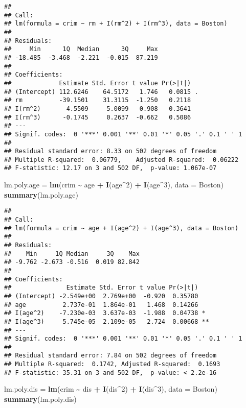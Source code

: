 \documentclass[
]{article}
\newenvironment{Shaded}{\begin{snugshade}}{\end{snugshade}}
\newcommand{\AttributeTok}[1]{\textcolor[rgb]{0.13,0.29,0.53}{#1}}
\newcommand{\DecValTok}[1]{\textcolor[rgb]{0.00,0.00,0.81}{#1}}
\newcommand{\FunctionTok}[1]{\textcolor[rgb]{0.13,0.29,0.53}{\textbf{#1}}}
\newcommand{\NormalTok}[1]{#1}
\newcommand{\OtherTok}[1]{\textcolor[rgb]{0.56,0.35,0.01}{#1}}
\newcommand{\SpecialCharTok}[1]{\textcolor[rgb]{0.81,0.36,0.00}{\textbf{#1}}}
\begin{document}
\begin{verbatim}
## 
## Call:
## lm(formula = crim ~ rm + I(rm^2) + I(rm^3), data = Boston)
## 
## Residuals:
##     Min      1Q  Median      3Q     Max 
## -18.485  -3.468  -2.221  -0.015  87.219 
## 
## Coefficients:
##             Estimate Std. Error t value Pr(>|t|)  
## (Intercept) 112.6246    64.5172   1.746   0.0815 .
## rm          -39.1501    31.3115  -1.250   0.2118  
## I(rm^2)       4.5509     5.0099   0.908   0.3641  
## I(rm^3)      -0.1745     0.2637  -0.662   0.5086  
## ---
## Signif. codes:  0 '***' 0.001 '**' 0.01 '*' 0.05 '.' 0.1 ' ' 1
## 
## Residual standard error: 8.33 on 502 degrees of freedom
## Multiple R-squared:  0.06779,    Adjusted R-squared:  0.06222 
## F-statistic: 12.17 on 3 and 502 DF,  p-value: 1.067e-07
\end{verbatim}

\begin{Shaded}
\begin{Highlighting}[]
\NormalTok{lm.poly.age }\OtherTok{=} \FunctionTok{lm}\NormalTok{(crim }\SpecialCharTok{\textasciitilde{}}\NormalTok{ age }\SpecialCharTok{+} \FunctionTok{I}\NormalTok{(age}\SpecialCharTok{\^{}}\DecValTok{2}\NormalTok{) }\SpecialCharTok{+} \FunctionTok{I}\NormalTok{(age}\SpecialCharTok{\^{}}\DecValTok{3}\NormalTok{), }\AttributeTok{data =}\NormalTok{ Boston)}
\FunctionTok{summary}\NormalTok{(lm.poly.age)}
\end{Highlighting}
\end{Shaded}

\begin{verbatim}
## 
## Call:
## lm(formula = crim ~ age + I(age^2) + I(age^3), data = Boston)
## 
## Residuals:
##    Min     1Q Median     3Q    Max 
## -9.762 -2.673 -0.516  0.019 82.842 
## 
## Coefficients:
##               Estimate Std. Error t value Pr(>|t|)   
## (Intercept) -2.549e+00  2.769e+00  -0.920  0.35780   
## age          2.737e-01  1.864e-01   1.468  0.14266   
## I(age^2)    -7.230e-03  3.637e-03  -1.988  0.04738 * 
## I(age^3)     5.745e-05  2.109e-05   2.724  0.00668 **
## ---
## Signif. codes:  0 '***' 0.001 '**' 0.01 '*' 0.05 '.' 0.1 ' ' 1
## 
## Residual standard error: 7.84 on 502 degrees of freedom
## Multiple R-squared:  0.1742, Adjusted R-squared:  0.1693 
## F-statistic: 35.31 on 3 and 502 DF,  p-value: < 2.2e-16
\end{verbatim}

\begin{Shaded}
\begin{Highlighting}[]
\NormalTok{lm.poly.dis }\OtherTok{=} \FunctionTok{lm}\NormalTok{(crim }\SpecialCharTok{\textasciitilde{}}\NormalTok{ dis }\SpecialCharTok{+} \FunctionTok{I}\NormalTok{(dis}\SpecialCharTok{\^{}}\DecValTok{2}\NormalTok{) }\SpecialCharTok{+} \FunctionTok{I}\NormalTok{(dis}\SpecialCharTok{\^{}}\DecValTok{3}\NormalTok{), }\AttributeTok{data =}\NormalTok{ Boston)}
\FunctionTok{summary}\NormalTok{(lm.poly.dis)}
\end{Highlighting}
\end{Shaded}
\end{document}

